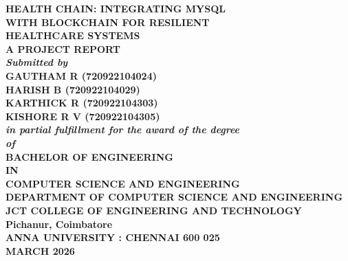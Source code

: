 \documentclass[12pt,a4paper]{report}
\begin{document}
\hypersetup{pageanchor=false}

\begin{titlepage}
\thispagestyle{empty}
\begin{center}

{\fontsize{18}{27}\selectfont\textbf{HEALTH CHAIN: INTEGRATING MYSQL}}\\[0.20cm]
{\fontsize{18}{27}\selectfont\textbf{WITH BLOCKCHAIN FOR RESILIENT}}\\[0.20cm]
{\fontsize{18}{27}\selectfont\textbf{HEALTHCARE SYSTEMS}}\\[1.00cm]

{\fontsize{14}{21}\selectfont\textbf{A PROJECT REPORT}}\\[0.55cm]
{\fontsize{14}{21}\selectfont\textbf{\textit{Submitted by}}}\\[0.65cm]

{\fontsize{16}{24}\selectfont\textbf{GAUTHAM R (720922104024)}}\\[0.28cm]
{\fontsize{16}{24}\selectfont\textbf{HARISH B (720922104029)}}\\[0.28cm]
{\fontsize{16}{24}\selectfont\textbf{KARTHICK R (720922104303)}}\\[0.28cm]
{\fontsize{16}{24}\selectfont\textbf{KISHORE R V (720922104305)}}\\[0.95cm]

{\fontsize{14}{21}\selectfont\textbf{\textit{in partial fulfillment for the award of the degree}}}\\[0.45cm]
{\fontsize{14}{21}\selectfont\textbf{\textit{of}}}\\[0.55cm]

{\fontsize{16}{24}\selectfont\textbf{BACHELOR OF ENGINEERING}}\\[0.35cm]
{\fontsize{14}{21}\selectfont\textbf{IN}}\\[0.35cm]
{\fontsize{14}{21}\selectfont\textbf{COMPUTER SCIENCE AND ENGINEERING}}\\[0.95cm]

{\fontsize{14}{21}\selectfont\textbf{DEPARTMENT OF COMPUTER SCIENCE AND ENGINEERING}}\\[0.25cm]
{\fontsize{14}{21}\selectfont\textbf{JCT COLLEGE OF ENGINEERING AND TECHNOLOGY}}\\[0.20cm]
{\fontsize{14}{21}\selectfont\textbf{Pichanur, Coimbatore}}\\[0.60cm]

{\fontsize{16}{24}\selectfont\textbf{ANNA UNIVERSITY : CHENNAI 600 025}}\\[0.70cm]

{\fontsize{14}{21}\selectfont\textbf{MARCH 2026}}

\end{center}
\end{titlepage}
\end{document}
